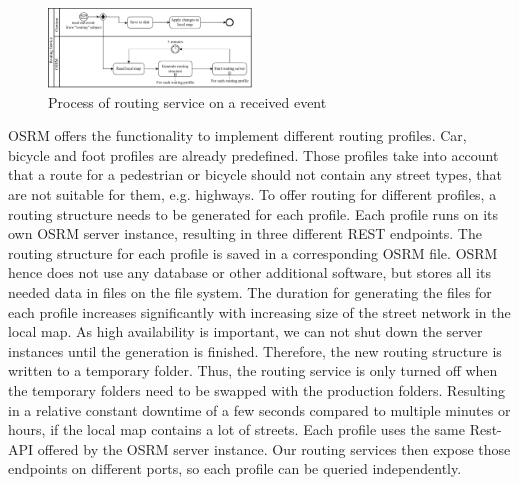 \documentclass[conference]{IEEEtran}
\begin{document}
\begin{figure}[h]
    \centering
    \includegraphics[width=0.48\textwidth]{figures/routing.pdf}
    \caption{Process of routing service on a received event}
    \label{fig:routing_bpmn}
\end{figure}
OSRM offers the functionality to implement different routing profiles. Car, bicycle and foot profiles are already predefined. Those profiles take into account that a route for a pedestrian or bicycle should not contain any street types, that are not suitable for them, e.g. highways. To offer routing for different profiles, a routing structure needs to be generated for each profile. Each profile runs on its own OSRM server instance, resulting in three different REST endpoints. The routing structure for each profile is saved in a corresponding OSRM file. OSRM hence does not use any database or other additional software, but stores all its needed data in files on the file system. The duration for generating the files for each profile increases significantly with increasing size of the street network in the local map. As high availability is important, we can not shut down the server instances until the generation is finished. Therefore, the new routing structure is written to a temporary folder. Thus, the routing service is only turned off when the temporary folders need to be swapped with the production folders. Resulting in a relative constant downtime of a few seconds compared to multiple minutes or hours, if the local map contains a lot of streets.
Each profile uses the same Rest-API offered by the OSRM server instance. Our routing services then expose those endpoints on different ports, so each profile can be queried independently.
\end{document}
